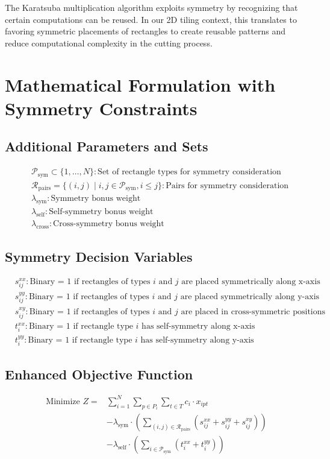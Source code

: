 \documentclass{article}
\begin{document}
The Karatsuba multiplication algorithm exploits symmetry by recognizing that certain computations can be reused. In our 2D tiling context, this translates to favoring symmetric placements of rectangles to create reusable patterns and reduce computational complexity in the cutting process.

\section{Mathematical Formulation with Symmetry Constraints}

\subsection{Additional Parameters and Sets}
\begin{align*}
& \mathcal{P}_{\text{sym}} \subset \{1,\ldots,N\}: \text{Set of rectangle types for symmetry consideration} \\
& \mathcal{R}_{\text{pairs}} = \{(i,j) \mid i,j \in \mathcal{P}_{\text{sym}}, i \leq j\}: \text{Pairs for symmetry consideration} \\
& \lambda_{\text{sym}}: \text{Symmetry bonus weight} \\
& \lambda_{\text{self}}: \text{Self-symmetry bonus weight} \\
& \lambda_{\text{cross}}: \text{Cross-symmetry bonus weight}
\end{align*}

\subsection{Symmetry Decision Variables}
\begin{align*}
& s_{ij}^{xx}: \text{Binary = 1 if rectangles of types } i \text{ and } j \text{ are placed symmetrically along x-axis} \\
& s_{ij}^{yy}: \text{Binary = 1 if rectangles of types } i \text{ and } j \text{ are placed symmetrically along y-axis} \\
& s_{ij}^{xy}: \text{Binary = 1 if rectangles of types } i \text{ and } j \text{ are placed in cross-symmetric positions} \\
& t_{i}^{xx}: \text{Binary = 1 if rectangle type } i \text{ has self-symmetry along x-axis} \\
& t_{i}^{yy}: \text{Binary = 1 if rectangle type } i \text{ has self-symmetry along y-axis}
\end{align*}

\subsection{Enhanced Objective Function}
\begin{align*}
\text{Minimize } Z = & \sum_{i=1}^{N} \sum_{p \in P_i} \sum_{t \in T} c_i \cdot x_{ipt} \\
& - \lambda_{\text{sym}} \cdot \left( \sum_{(i,j) \in \mathcal{R}_{\text{pairs}}} \left( s_{ij}^{xx} + s_{ij}^{yy} + s_{ij}^{xy} \right) \right) \\
& - \lambda_{\text{self}} \cdot \left( \sum_{i \in \mathcal{P}_{\text{sym}}} \left( t_{i}^{xx} + t_{i}^{yy} \right) \right)
\end{align*}
\end{document}
